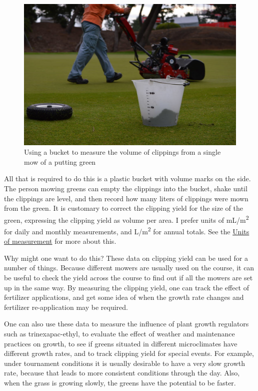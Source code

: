 \documentclass[12pt,b5,]{tufte-book}
\begin{document}
\begin{figure}
\centering
\includegraphics{img/b9-1.jpg}
\caption{Using a bucket to measure the volume of clippings from a single mow of a putting green}
\end{figure}

All that is required to do this is a plastic bucket with volume marks on the side. The person mowing greens can empty the clippings into the bucket, shake until the clippings are level, and then record how many liters of clippings were mown from the green. It is customary to correct the clipping yield for the size of the green, expressing the clipping yield as volume per area. I prefer units of mL/m\textsuperscript{2} for daily and monthly measurements, and L/m\textsuperscript{2} for annual totals. See the \protect\hyperlink{unitsChapter}{Units of measurement} for more about this.

Why might one want to do this? These data on clipping yield can be used for a number of things. Because different mowers are usually used on the course, it can be useful to check the yield across the course to find out if all the mowers are set up in the same way. By measuring the clipping yield, one can track the effect of fertilizer applications, and get some idea of when the growth rate changes and fertilizer re-application may be required.

One can also use these data to measure the influence of plant growth regulators such as trinexapac-ethyl, to evaluate the effect of weather and maintenance practices on growth, to see if greens situated in different microclimates have different growth rates, and to track clipping yield for special events. For example, under tournament conditions it is usually desirable to have a very slow growth rate, because that leads to more consistent conditions through the day. Also, when the grass is growing slowly, the greens have the potential to be faster.
\end{document}
